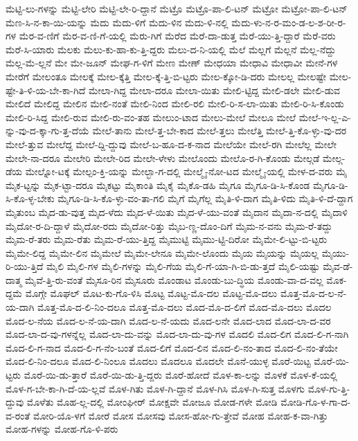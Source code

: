{ಮೆಟ್ಟಿ-ಲು-ಗಳನ್ನು
ಮೆಟ್ಟಿ-ಲೇರಿ
ಮೆಟ್ಟಿ-ಲೇ-ರಿ-ದ್ದಾನೆ
ಮೆಟ್ರೊ
ಮೆಟ್ರೊ-ಪಾ-ಲಿ-ಟನ್
ಮೆಟ್ರೋ
ಮೆಟ್ರೋ-ಪಾ-ಲಿ-ಟನ್
ಮೆಣ-ಸಿ-ನ-ಕಾ-ಯಿ-ಯನ್ನು
ಮೆದು
ಮೆದು-ಳಿಗೆ
ಮೆದು-ಳಿನ
ಮೆದು-ಳಿ-ನಲ್ಲಿ
ಮೆದು-ಳು-ನ-ರ-ಮಂ-ಡ-ಲ-ಶ-ರೀ-ರ-ಗಳ
ಮೆರ-ವ-ಣಿಗೆ
ಮೆರ-ವ-ಣಿ-ಗೆ-ಯಲ್ಲಿ
ಮೆರು-ಗಿಗೆ
ಮೆರೆದ
ಮೆರೆ-ದಾ-ಡುತ್ತ
ಮೆರೆ-ಯು-ತ್ತಿ-ದ್ದಾರೆ
ಮೆರೆ-ವರು
ಮೆರೆ-ಸಿ-ಯಾರು
ಮೆಲಕು
ಮೆಲು-ಕು-ಹಾ-ಕು-ತ್ತಿ-ದ್ದರು
ಮೆಲು-ದ-ನಿ-ಯಲ್ಲಿ
ಮೆಲೆ
ಮೆಲ್ಲಗೆ
ಮೆಲ್ಲನೆ
ಮೆಲ್ಲ-ನೆದ್ದು
ಮೆಲ್ಲ-ಮೆ-ಲ್ಲನೆ
ಮೇ
ಮೇ-ಜೂನ್
ಮೇಘ-ಗ-ಳಿಗೆ
ಮೇಣ
ಮೇಣ್
ಮೇಧಯಾ
ಮೇಧಾವಿ
ಮೇಧಾವೀ
ಮೇನೆ-ಗಳ
ಮೇರೆಗೆ
ಮೇಲಂತೂ
ಮೇಲಕ್ಕೆ
ಮೇಲ-ಕ್ಕೆತ್ತಿ
ಮೇಲ-ಕ್ಕೆ-ತ್ತಿ-ಬಿ-ಟ್ಟರು
ಮೇಲ-ಕ್ಕೋ-ಡಿ-ದರು
ಮೇಲಲ್ಲ
ಮೇಲಷ್ಟೇ
ಮೇಲ-ಷ್ಟೇ-ತಿ-ಳಿ-ಯ-ಬೇ-ಕಾ-ಗಿದೆ
ಮೇಲಾ-ಗಿದ್ದ
ಮೇಲಾ-ದರೂ
ಮೇಲಾ-ಯಿತು
ಮೇಲಿ-ಟ್ಟಿದ್ದ
ಮೇಲಿ-ಡಲೇ
ಮೇಲಿ-ಡುವ
ಮೇಲಿದೆ
ಮೇಲಿದ್ದ
ಮೇಲಿನ
ಮೇಲಿ-ನಂತೆ
ಮೇಲಿ-ನಿಂದ
ಮೇಲಿ-ರಲಿ
ಮೇಲಿ-ರಿ-ಸ-ಲಾ-ಯಿತು
ಮೇಲಿ-ರಿ-ಸಿ-ಕೊಂಡು
ಮೇಲಿ-ರಿ-ಸಿದ್ದ
ಮೇಲಿ-ರುವ
ಮೇಲಿ-ರು-ವಂ-ತಹ
ಮೇಲುಂ-ಟಾದ
ಮೇಲು-ಮೇಲೆ
ಮೇಲೂ
ಮೇಲೆ
ಮೇಲೆ-ಇ-ಲ್ಲ-ಎ-ನ್ನು-ವು-ದ-ಕ್ಕಾ-ಗು-ತ್ತ-ದೆಯೆ
ಮೇಲೆ-ತಾನು
ಮೇಲೆ-ತ್ತ-ಬೇ-ಕಾದ
ಮೇಲೆ-ತ್ತಲು
ಮೇಲೆತ್ತಿ
ಮೇಲೆ-ತ್ತಿ-ಕೊ-ಳ್ಳು-ವು-ದರ
ಮೇಲೆ-ತ್ತುವ
ಮೇಲೆದ್ದ
ಮೇಲೆ-ದ್ದಿ-ದ್ದುವು
ಮೇಲೆ-ಬ-ಹೂ-ದ-ಕ-ನಾದ
ಮೇಲೆಯೇ
ಮೇಲೆ-ರಗಿ
ಮೇಲೆಲ್ಲ
ಮೇಲೇ
ಮೇಲೇ-ನಾ-ದರೂ
ಮೇಲೇರಿ
ಮೇಲೇ-ರಿದ
ಮೇಲೇ-ಳೇಳು
ಮೇಲೊಂದು
ಮೇಲೊ-ರ-ಗಿ-ಕೊಂಡು
ಮೇಲ್ಗಡೆ
ಮೇಲ್ಗ-ಡೆಯ
ಮೇಲ್ನೋ-ಟಕ್ಕೆ
ಮೇಲ್ಪಂ-ಕ್ತಿ-ಯನ್ನು
ಮೇಲ್ಭಾ-ಗ-ದಲ್ಲಿ
ಮೇಲ್ಮೈ-ನೋ-ಟದ
ಮೇಲ್ಮೈ-ಯಲ್ಲಿ
ಮೇಳ-ದ-ವರು
ಮೈ
ಮೈಕ-ಟ್ಟನ್ನು
ಮೈಕ-ಟ್ಟಾ-ದರೂ
ಮೈಕಟ್ಟು
ಮೈಕಾಂತಿ
ಮೈಕೈ
ಮೈಕೊ-ಡಹಿ
ಮೈಗೂ
ಮೈಗೂ-ಡಿ-ಸಿ-ಕೊಂಡ
ಮೈಗೂ-ಡಿ-ಸಿ-ಕೊ-ಳ್ಳ-ಬೇಕು
ಮೈಗೂ-ಡಿ-ಸಿ-ಕೊ-ಳ್ಳು-ವಂ-ತಾ-ಗಲಿ
ಮೈಗೆ
ಮೈಗೆಲ್ಲ
ಮೈತಿ-ಳಿ-ದಾಗ
ಮೈತಿ-ಳಿದು
ಮೈತಿ-ಳಿ-ದೆ-ದ್ದಾಗ
ಮೈತುಂಬ
ಮೈದ-ಡು-ವುತ್ತ
ಮೈದ-ಳೆದು
ಮೈದ-ಳೆ-ಯಿತು
ಮೈದ-ಳೆ-ಯು-ವಂತೆ
ಮೈದಾನ
ಮೈದಾ-ನ-ದಲ್ಲಿ
ಮೈದಾಳಿ
ಮೈದೋ-ರ-ದಿ-ದ್ದಾಳೆ
ಮೈದೋ-ರದು
ಮೈದೋ-ರಿತ್ತು
ಮೈಬ-ಣ್ಣ-ದೊಂ-ದಿಗೆ
ಮೈಮ-ನ-ವನು
ಮೈಮ-ರೆ-ತದ್ದು
ಮೈಮ-ರೆ-ತರು
ಮೈಮ-ರೆತು
ಮೈಮ-ರೆ-ಯು-ತ್ತಿದ್ದ
ಮೈಮುಟ್ಟಿ
ಮೈಮು-ಟ್ಟಿ-ದಿರೋ
ಮೈಮೇ-ಲಿ-ಟ್ಟು-ಬಿ-ಟ್ಟರು
ಮೈಮೇ-ಲಿದ್ದ
ಮೈಮೇ-ಲಿನ
ಮೈಮೇಲೆ
ಮೈಮೇ-ಲೇನೂ
ಮೈಮೇ-ಲೊಂದು
ಮೈಯ
ಮೈಯನ್ನು
ಮೈಯಲ್ಲ
ಮೈಯು-ರಿ-ಯು-ತ್ತಿದೆ
ಮೈಲಿ
ಮೈಲಿ-ಗಳ
ಮೈಲಿ-ಗಳನ್ನು
ಮೈಲಿ-ಗೆಯ
ಮೈಲಿ-ಗೆ-ಯಾ-ಗಿ-ಬಿ-ಡು-ತ್ತದೆ
ಮೈಲಿ-ಯಷ್ಟು
ಮೈವ-ಡೆ-ದಾತ್ಮ
ಮೈವೆ-ತ್ತಿ-ರು-ವಂತೆ
ಮೈಸೂ-ರಿನ
ಮೈಸೂರು
ಮೊಂಡಾಟ
ಮೊಂಡು-ಬು-ದ್ಧಿಯ
ಮೊಂಡು-ವಾ-ದ-ವಲ್ಲ
ಮೊಕ-ದ್ದಮೆ
ಮೊಗ್ಗೇ
ಮೊಘಲ್
ಮೊಟ-ಕು-ಗೊ-ಳಿಸಿ
ಮೊಟ್ಟ
ಮೊಟ್ಟ-ಮೊ-ದಲ
ಮೊಟ್ಟ-ಮೊ-ದಲು
ಮೊತ್ತ-ಮೊ-ದ-ಲ-ನೆ-ಯ-ದಾಗಿ
ಮೊತ್ತ-ಮೊ-ದ-ಲಿ-ನಿಂ-ದಲೂ
ಮೊತ್ತ-ಮೊ-ದಲು
ಮೊದ-ಮೊ-ದ-ಲಿಗೆ
ಮೊದ-ಮೊ-ದಲು
ಮೊದಲ
ಮೊದ-ಲ-ನೆಯ
ಮೊದ-ಲ-ನೆ-ಯ-ದಾಗಿ
ಮೊದ-ಲ-ನೆ-ಯದು
ಮೊದ-ಲನೇ
ಮೊದ-ಲಾದ
ಮೊದ-ಲಾ-ದ-ವರ
ಮೊದ-ಲಾ-ದ-ವು-ಗಳನ್ನೆಲ್ಲ
ಮೊದ-ಲಾ-ದು-ವನ್ನು
ಮೊದ-ಲಾ-ದು-ವು-ಗಳ
ಮೊದಲಿ
ಮೊದ-ಲಿಗ
ಮೊದ-ಲಿ-ಗ-ನಾಗಿ
ಮೊದ-ಲಿ-ಗ-ನಾದ
ಮೊದ-ಲಿ-ಗ-ನೆಂ-ಬಂತೆ
ಮೊದ-ಲಿಗೆ
ಮೊದ-ಲಿನ
ಮೊದ-ಲಿ-ನಂ-ತಾದ
ಮೊದ-ಲಿ-ನಂ-ತೆಯೇ
ಮೊದ-ಲಿ-ನಿಂ-ದಲೂ
ಮೊದ-ಲಿ-ನಿಂಲೂ
ಮೊದಲು
ಮೊದಲೂ
ಮೊದಲೇ
ಮೊನೆ-ಯುಳ್ಳ
ಮೊರೆ-ಯಿಟ್ಟ
ಮೊರೆ-ಯಿ-ಟ್ಟರು
ಮೊರೆ-ಯಿ-ಡು-ತ್ತಾರೆ
ಮೊರೆ-ಯಿ-ಡು-ತ್ತಿ-ದ್ದರು
ಮೊರೆ-ಹೋದೆ
ಮೊಳ-ಕಾ-ಲನ್ನು
ಮೊಳಕೆ
ಮೊಳ-ಕೆ-ಯಲ್ಲಿ
ಮೊಳ-ಗ-ಬೇ-ಕಾ-ಗಿ-ದೆ-ಯ-ಲ್ಲವೆ
ಮೊಳ-ಗಿತು
ಮೊಳ-ಗಿ-ದ್ದಾನೆ
ಮೊಳ-ಗಿಸಿ
ಮೊಳ-ಗಿ-ಸುತ್ತ
ಮೊಳಗು
ಮೊಳ-ಗು-ತ್ತಿ-ದ್ದುವು
ಮೊಳೆತು
ಮೊಹ-ಲ್ಲ-ದಲ್ಲಿ
ಮೋಂಘೀರ್
ಮೋಕ್ಷವೇ
ಮೋಜೂ
ಮೋಡ-ಗಳೇ
ಮೋಡಿ
ಮೋಡಿ-ಗೊ-ಳ-ಗಾ-ದ-ವ-ರಂತೆ
ಮೋರಿ-ಯೊ-ಳಗೆ
ಮೋರೆ
ಮೋಸ
ಮೋಸವು
ಮೋಸ-ಹೋ-ಗು-ತ್ತೇವೆ
ಮೋಹ
ಮೋಹ-ಕ-ವಾ-ಗಿತ್ತು
ಮೋಹ-ಗಳನ್ನು
ಮೋಹ-ಗೊ-ಳಿ-ಪರು
}
